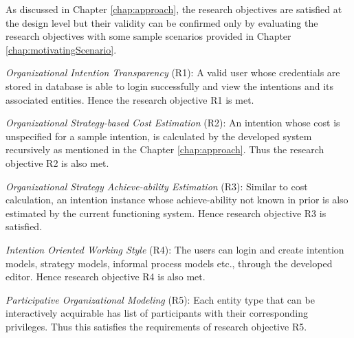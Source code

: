 As discussed in Chapter \ref{chap:approach}, the research objectives are satisfied at the design level but their validity can be confirmed only by evaluating the research objectives with some sample scenarios provided in Chapter \ref{chap:motivatingScenario}.   

\textit{Organizational Intention Transparency} (R1): A valid user whose credentials are stored in database is able to login successfully and view the intentions and its associated entities. Hence the research objective R1 is met.

\textit{Organizational Strategy-based Cost Estimation} (R2): An intention whose cost is unspecified for a sample intention, is calculated by the developed system recursively as mentioned in the Chapter \ref{chap:approach}. Thus the research objective R2 is also met.

\textit{Organizational Strategy Achieve-ability Estimation} (R3): Similar to cost calculation, an intention instance whose achieve-ability not known in prior is also estimated by the current functioning system. Hence research objective R3 is satisfied.

\textit{Intention Oriented Working Style} (R4): The users can login and create intention models, strategy models, informal process models etc., through the developed editor. Hence research objective R4 is also met.

\textit{Participative Organizational Modeling} (R5): Each entity type that can be interactively acquirable has list of participants with their corresponding privileges. Thus this satisfies the requirements of research objective R5.

